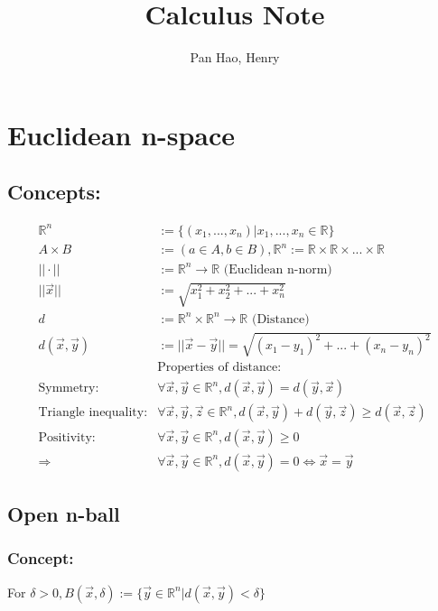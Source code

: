 \documentclass[11pt, a4paper]{article}
\begin{document}
\title{Calculus Note}
\author{Pan Hao, Henry}
\maketitle

    \section{Euclidean n-space}
        \subsection{Concepts:}
            $$\begin{aligned}
                \mathbb{R}^n &:= \{(x_1, ..., x_n)|x_1, ..., x_n \in \mathbb{R}\} \\
                A \times B &:= (a \in A, b \in B), \mathbb{R}^n := \mathbb{R} \times \mathbb{R} \times ... \times \mathbb{R} \\
                ||\cdot|| &:= \mathbb{R}^n \rightarrow \mathbb{R} \text{ (Euclidean n-norm)} \\
                ||\vec{x}|| &:= \sqrt{x_1^2 + x_2^2 + ... + x_n^2} \\
                d &:= \mathbb{R}^n \times \mathbb{R}^n \rightarrow \mathbb{R} \text{ (Distance)} \\
                d(\vec{x}, \vec{y}) &:= ||\vec{x} - \vec{y}|| = \sqrt{(x_1 - y_1)^2 + ... + (x_n - y_n)^2} \\
                &\text{Properties of distance:} \\
                \text{Symmetry:}& \forall \vec{x}, \vec{y} \in \mathbb{R}^n, d(\vec{x}, \vec{y}) = d(\vec{y}, \vec{x}) \\
                \text{Triangle inequality:}& \forall \vec{x}, \vec{y}, \vec{z} \in \mathbb{R}^n, d(\vec{x}, \vec{y}) + d(\vec{y}, \vec{z}) \geq d(\vec{x}, \vec{z}) \\
                \text{Positivity:}& \forall \vec{x}, \vec{y} \in \mathbb{R}^n, d(\vec{x}, \vec{y}) \geq 0 \\
                \Rightarrow& \forall \vec{x}, \vec{y} \in \mathbb{R}^n, d(\vec{x}, \vec{y}) = 0 \Leftrightarrow \vec{x} = \vec{y}
            \end{aligned}$$
        \subsection{Open n-ball}
            \subsubsection{Concept:} For $\delta > 0, B(\vec{x}, \delta) := \{\vec{y} \in \mathbb{R}^n | d(\vec{x}, \vec{y}) < \delta\}$
\end{document}
